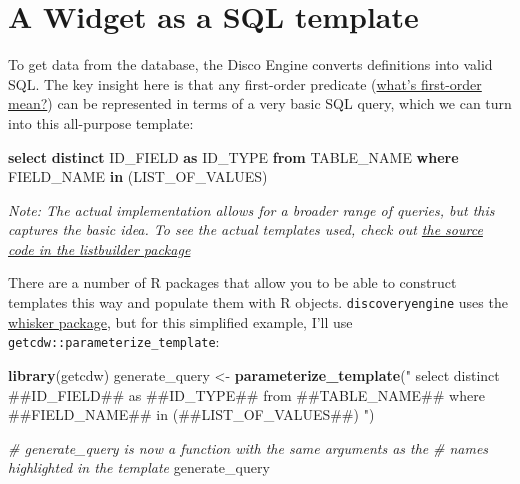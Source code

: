 \documentclass[]{book}
\newenvironment{Shaded}{\begin{snugshade}}{\end{snugshade}}
\newcommand{\CommentTok}[1]{\textcolor[rgb]{0.56,0.35,0.01}{\textit{#1}}}
\newcommand{\KeywordTok}[1]{\textcolor[rgb]{0.13,0.29,0.53}{\textbf{#1}}}
\newcommand{\NormalTok}[1]{#1}
\newcommand{\StringTok}[1]{\textcolor[rgb]{0.31,0.60,0.02}{#1}}
\begin{document}
\hypertarget{a-widget-as-a-sql-template}{%
\section{A Widget as a SQL template}\label{a-widget-as-a-sql-template}}

To get data from the database, the Disco Engine converts definitions into valid SQL. The key insight here is that any first-order predicate (\protect\hyperlink{higher-order-widgets}{what's first-order mean?}) can be represented in terms of a very basic SQL query, which we can turn into this all-purpose template:

\begin{Shaded}
\begin{Highlighting}[]
\KeywordTok{select} \KeywordTok{distinct}\NormalTok{ ID_FIELD }\KeywordTok{as}\NormalTok{ ID_TYPE}
\KeywordTok{from}\NormalTok{ TABLE_NAME}
\KeywordTok{where}\NormalTok{ FIELD_NAME }\KeywordTok{in}\NormalTok{ (LIST_OF_VALUES)}
\end{Highlighting}
\end{Shaded}

\emph{Note: The actual implementation allows for a broader range of queries, but this captures the basic idea. To see the actual templates used, check out \href{https://github.com/cwolfsonseeley/listbuilder/blob/master/R/templates.R}{the source code in the listbuilder package}}

There are a number of R packages that allow you to be able to construct templates this way and populate them with R objects. \texttt{discoveryengine} uses the \href{https://cran.r-project.org/web/packages/whisker/index.html}{whisker package}, but for this simplified example, I'll use \texttt{getcdw::parameterize\_template}:

\begin{Shaded}
\begin{Highlighting}[]
\KeywordTok{library}\NormalTok{(getcdw)}
\NormalTok{generate_query <-}\StringTok{ }\KeywordTok{parameterize_template}\NormalTok{(}\StringTok{"}
\StringTok{select distinct ##ID_FIELD## as ##ID_TYPE##}
\StringTok{from ##TABLE_NAME##}
\StringTok{where ##FIELD_NAME## in (##LIST_OF_VALUES##)}
\StringTok{"}\NormalTok{)}

\CommentTok{# generate_query is now a function with the same arguments as the }
\CommentTok{# names highlighted in the template}
\NormalTok{generate_query}
\end{Highlighting}
\end{Shaded}
\end{document}
